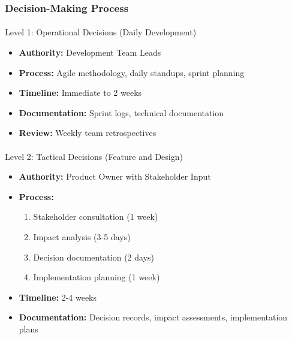 \documentclass[
  letterpaper,
  DIV=11,
  numbers=noendperiod]{scrartcl}
\makeatletter
\let\oldparagraph\paragraph
\renewcommand{\paragraph}{
    \@ifstar
      \xxxParagraphStar
      \xxxParagraphNoStar
  }
\newcommand{\xxxParagraphStar}[1]{\oldparagraph*{#1}\mbox{}}
\newcommand{\xxxParagraphNoStar}[1]{\oldparagraph{#1}\mbox{}}
\providecommand{\tightlist}{%
  \setlength{\itemsep}{0pt}\setlength{\parskip}{0pt}}\usepackage{longtable,booktabs,array}
\makeatother
\begin{document}
\subsubsection{Decision-Making Process}\label{decision-making-process}

\paragraph{Level 1: Operational Decisions (Daily
Development)}\label{level-1-operational-decisions-daily-development}

\begin{itemize}
\tightlist
\item
  \textbf{Authority:} Development Team Leads
\item
  \textbf{Process:} Agile methodology, daily standups, sprint planning
\item
  \textbf{Timeline:} Immediate to 2 weeks
\item
  \textbf{Documentation:} Sprint logs, technical documentation
\item
  \textbf{Review:} Weekly team retrospectives
\end{itemize}

\paragraph{Level 2: Tactical Decisions (Feature and
Design)}\label{level-2-tactical-decisions-feature-and-design}

\begin{itemize}
\tightlist
\item
  \textbf{Authority:} Product Owner with Stakeholder Input
\item
  \textbf{Process:}

  \begin{enumerate}
  \def\labelenumi{\arabic{enumi}.}
  \tightlist
  \item
    Stakeholder consultation (1 week)
  \item
    Impact analysis (3-5 days)
  \item
    Decision documentation (2 days)
  \item
    Implementation planning (1 week)
  \end{enumerate}
\item
  \textbf{Timeline:} 2-4 weeks
\item
  \textbf{Documentation:} Decision records, impact assessments,
  implementation plans
\end{itemize}
\end{document}

